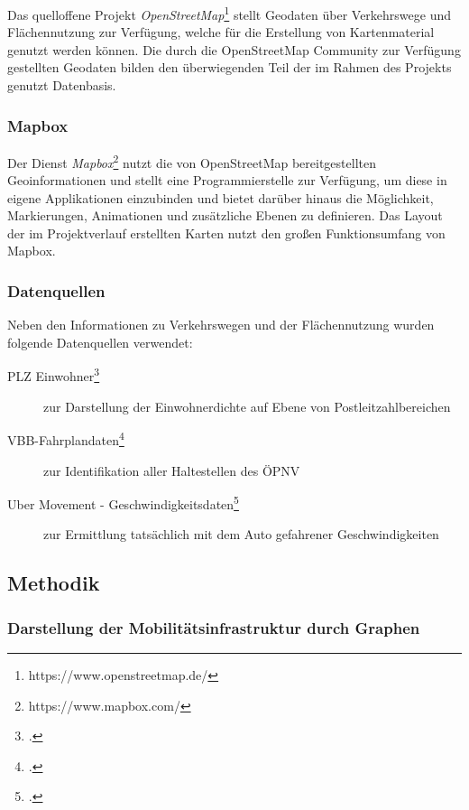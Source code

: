Das quelloffene Projekt \emph{OpenStreetMap}\footnote{https://www.openstreetmap.de/} stellt Geodaten über Verkehrswege und Flächennutzung zur Verfügung, welche für die Erstellung von Kartenmaterial genutzt werden können. Die durch die OpenStreetMap Community zur Verfügung gestellten Geodaten bilden den überwiegenden Teil der im Rahmen des Projekts genutzt Datenbasis.

\subsubsection{Mapbox}
\label{mapbox}

Der Dienst \emph{Mapbox}\footnote{https://www.mapbox.com/} nutzt die von OpenStreetMap bereitgestellten Geoinformationen und stellt eine Programmierstelle zur Verfügung, um diese in eigene Applikationen einzubinden und bietet darüber hinaus die Möglichkeit, Markierungen, Animationen und zusätzliche Ebenen zu definieren. Das Layout der im Projektverlauf erstellten Karten nutzt den großen Funktionsumfang von Mapbox.

\subsubsection{Datenquellen}
\label{datenquellen}

Neben den Informationen zu Verkehrswegen und der Flächennutzung wurden folgende Datenquellen verwendet:

\begin{description}
    \item[PLZ Einwohner\footcite{Einwohnerdaten}] zur Darstellung der Einwohnerdichte auf Ebene von Postleitzahlbereichen
    \item[VBB-Fahrplandaten\footcite{Fahrplandaten}] zur Identifikation aller Haltestellen des \ac{ÖPNV}
    \item[Uber Movement - Geschwindigkeitsdaten\footcite{Uberdaten}] zur Ermittlung tatsächlich mit dem Auto gefahrener Geschwindigkeiten
\end{description}

\subsection{Methodik}
\label{methodik}

\subsubsection{Darstellung der Mobilitätsinfrastruktur durch Graphen}
\label{darstellung_der_mobiltaetsinfrastruktur_durch_graphen}

